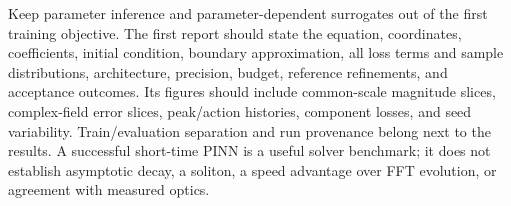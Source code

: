 \documentclass[11pt]{article}
\begin{document}
Keep parameter inference and parameter-dependent surrogates out of the first training objective. The first report should state the equation, coordinates, coefficients, initial condition, boundary approximation, all loss terms and sample distributions, architecture, precision, budget, reference refinements, and acceptance outcomes. Its figures should include common-scale magnitude slices, complex-field error slices, peak/action histories, component losses, and seed variability. Train/evaluation separation and run provenance belong next to the results. A successful short-time PINN is a useful solver benchmark; it does not establish asymptotic decay, a soliton, a speed advantage over FFT evolution, or agreement with measured optics.
\end{document}
